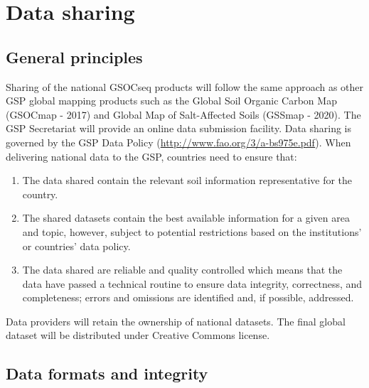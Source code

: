 \documentclass[
  10pt,
  b5paper,
]{book}
\providecommand{\tightlist}{%
  \setlength{\itemsep}{0pt}\setlength{\parskip}{0pt}}
\begin{document}
\hypertarget{data-sharing}{%
\chapter{\textbar{} Data sharing}\label{data-sharing}}

\hypertarget{general-principles}{%
\section{General principles}\label{general-principles}}

Sharing of the national GSOCseq products will follow the same approach as other GSP global mapping products such as the Global Soil Organic Carbon Map (GSOCmap - 2017) and Global Map of Salt-Affected Soils (GSSmap - 2020). The GSP Secretariat will provide an online data submission facility.
Data sharing is governed by the GSP Data Policy (\url{http://www.fao.org/3/a-bs975e.pdf}). When delivering national data to the GSP, countries need to ensure that:

\begin{enumerate}
\def\labelenumi{\arabic{enumi}.}
\tightlist
\item
  The data shared contain the relevant soil information representative for the country.
\item
  The shared datasets contain the best available information for a given area and topic, however, subject to potential restrictions based on the institutions' or countries' data policy.
\item
  The data shared are reliable and quality controlled which means that the data have passed a technical routine to ensure data integrity, correctness, and completeness; errors and omissions are identified and, if possible, addressed.
\end{enumerate}

Data providers will retain the ownership of national datasets. The final global dataset will be distributed under Creative Commons license.

\hypertarget{data-formats-and-integrity}{%
\section{Data formats and integrity}\label{data-formats-and-integrity}}
\end{document}
